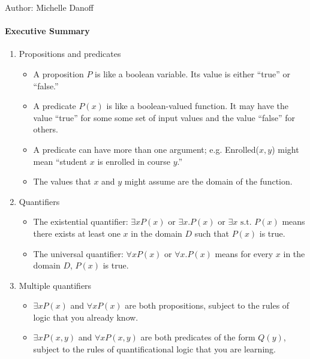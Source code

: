 \documentclass[solution, letterpaper]{cs20inclass}
\begin{document}

\noindent Author: Michelle Danoff%

\paragraph*{Executive Summary}

\begin{enumerate}

\item Propositions and predicates
\begin{itemize}

\item A proposition $P$ is like a boolean variable. Its value is either ``true'' or ``false.''
\item A predicate $P(x)$ is like a boolean-valued function. It may have the value ``true'' for some some set of input values and the value ``false'' for others.
\item A predicate can have more than one argument; e.g. Enrolled($x, y$) might mean ``student $x$ is enrolled in course $y$.'' 
\item The values that  $x$ and $y$ might assume are the domain of the function. 
\end{itemize}

\item Quantifiers
\begin{itemize}
\item The existential quantifier: $\exists x P(x)$ or $\exists x. P(x)$ or $\exists x \mbox{ s.t. }P(x)$ means there exists at least one $x$ in the domain $D$ such that $P(x)$ is true.

\item The universal quantifier: $\forall x P(x)$ or $\forall x. P(x)$  means for every $x$ in the domain $D$, $P(x)$ is true.

\end{itemize}

\item Multiple quantifiers
\begin{itemize}

\item  $\exists x P(x)$ and $\forall x P(x)$ are both propositions, subject to the rules of logic that you already know.

\item  $\exists x P(x,y)$ and $\forall x P(x,y)$ are both predicates of the form $Q(y)$, subject to the rules of quantificational logic that you are learning.


\end{itemize}
\end{enumerate}
\end{document}
